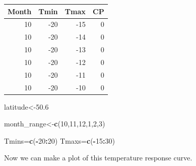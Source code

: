 \documentclass[
]{book}
\newenvironment{Shaded}{\begin{snugshade}}{\end{snugshade}}
\newcommand{\DataTypeTok}[1]{\textcolor[rgb]{0.13,0.29,0.53}{#1}}
\newcommand{\DecValTok}[1]{\textcolor[rgb]{0.00,0.00,0.81}{#1}}
\newcommand{\FloatTok}[1]{\textcolor[rgb]{0.00,0.00,0.81}{#1}}
\newcommand{\KeywordTok}[1]{\textcolor[rgb]{0.13,0.29,0.53}{\textbf{#1}}}
\newcommand{\NormalTok}[1]{#1}
\newcommand{\OperatorTok}[1]{\textcolor[rgb]{0.81,0.36,0.00}{\textbf{#1}}}
\newcommand{\StringTok}[1]{\textcolor[rgb]{0.31,0.60,0.02}{#1}}
\begin{document}
\begin{Shaded}
\end{Shaded}

\begingroup\fontsize{10}{12}\selectfont

\begin{tabular}{r|r|r|r}
\hline
Month & Tmin & Tmax & CP\\
\hline
10 & -20 & -15 & 0\\
\hline
10 & -20 & -14 & 0\\
\hline
10 & -20 & -13 & 0\\
\hline
10 & -20 & -12 & 0\\
\hline
10 & -20 & -11 & 0\\
\hline
10 & -20 & -10 & 0\\
\hline
\end{tabular}
\endgroup{}

\begin{Shaded}
\begin{Highlighting}[]
\NormalTok{latitude<-}\FloatTok{50.6}

\NormalTok{month_range<-}\KeywordTok{c}\NormalTok{(}\DecValTok{10}\NormalTok{,}\DecValTok{11}\NormalTok{,}\DecValTok{12}\NormalTok{,}\DecValTok{1}\NormalTok{,}\DecValTok{2}\NormalTok{,}\DecValTok{3}\NormalTok{)}

\NormalTok{Tmins=}\KeywordTok{c}\NormalTok{(}\OperatorTok{-}\DecValTok{20}\OperatorTok{:}\DecValTok{20}\NormalTok{)}
\NormalTok{Tmaxs=}\KeywordTok{c}\NormalTok{(}\OperatorTok{-}\DecValTok{15}\OperatorTok{:}\DecValTok{30}\NormalTok{)}
\end{Highlighting}
\end{Shaded}

Now we can make a plot of this temperature response curve.
\end{document}

